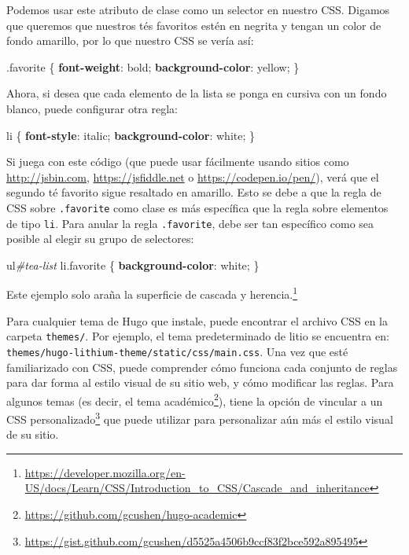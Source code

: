 \documentclass[12pt,]{krantz}
\makeatletter
\newenvironment{Shaded}{\begin{snugshade}}{\end{snugshade}}
\newcommand{\DecValTok}[1]{\textcolor[rgb]{0.00,0.00,0.81}{#1}}
\newcommand{\FunctionTok}[1]{\textcolor[rgb]{0.00,0.00,0.00}{#1}}
\newcommand{\KeywordTok}[1]{\textcolor[rgb]{0.13,0.29,0.53}{\textbf{#1}}}
\newcommand{\NormalTok}[1]{#1}
\newcommand{\PreprocessorTok}[1]{\textcolor[rgb]{0.56,0.35,0.01}{\textit{#1}}}
\renewcommand{\href}[2]{#2\footnote{\url{#1}}}
\newenvironment{kframe}{%
\medskip{}
\setlength{\fboxsep}{.8em}
 \def\at@end@of@kframe{}%
 \ifinner\ifhmode%
  \def\at@end@of@kframe{\end{minipage}}%
  \begin{minipage}{\columnwidth}%
 \fi\fi%
 \def\FrameCommand##1{\hskip\@totalleftmargin \hskip-\fboxsep
 \colorbox{shadecolor}{##1}\hskip-\fboxsep
     \hskip-\linewidth \hskip-\@totalleftmargin \hskip\columnwidth}%
 \MakeFramed {\advance\hsize-\width
   \@totalleftmargin\z@ \linewidth\hsize
   \@setminipage}}%
 {\par\unskip\endMakeFramed%
 \at@end@of@kframe}
\renewenvironment{Shaded}{\begin{kframe}}{\end{kframe}}
\theoremstyle{definition}
\theoremstyle{definition}
\theoremstyle{definition}
\theoremstyle{remark}
\makeatother
\begin{document}
Podemos usar este atributo de clase como un selector en nuestro CSS.
Digamos que queremos que nuestros tés favoritos estén en negrita y
tengan un color de fondo amarillo, por lo que nuestro CSS se vería así:

\begin{Shaded}
\begin{Highlighting}[]
\FunctionTok{.favorite}\NormalTok{ \{}
  \KeywordTok{font-weight}\NormalTok{: }\DecValTok{bold}\NormalTok{;}
  \KeywordTok{background-color}\NormalTok{: }\DecValTok{yellow}\NormalTok{;}
\NormalTok{\}}
\end{Highlighting}
\end{Shaded}

Ahora, si desea que cada elemento de la lista se ponga en cursiva con un
fondo blanco, puede configurar otra regla:

\begin{Shaded}
\begin{Highlighting}[]
\NormalTok{li \{ }
  \KeywordTok{font-style}\NormalTok{: }\DecValTok{italic}\NormalTok{;}
  \KeywordTok{background-color}\NormalTok{: }\DecValTok{white}\NormalTok{;}
\NormalTok{\}}
\end{Highlighting}
\end{Shaded}

Si juega con este código (que puede usar fácilmente usando sitios como
\url{http://jsbin.com}, \url{https://jsfiddle.net} o
\url{https://codepen.io/pen/}), verá que el segundo té favorito sigue
resaltado en amarillo. Esto se debe a que la regla de CSS sobre
\texttt{.favorite} como clase es más específica que la regla sobre
elementos de tipo \texttt{li}. Para anular la regla \texttt{.favorite},
debe ser tan específico como sea posible al elegir su grupo de
selectores:

\begin{Shaded}
\begin{Highlighting}[]
\NormalTok{ul}\PreprocessorTok{#tea-list}\NormalTok{ li}\FunctionTok{.favorite}\NormalTok{ \{}
  \KeywordTok{background-color}\NormalTok{: }\DecValTok{white}\NormalTok{;}
\NormalTok{\}}
\end{Highlighting}
\end{Shaded}

Este ejemplo solo araña la superficie de
\href{https://developer.mozilla.org/en-US/docs/Learn/CSS/Introduction_to_CSS/Cascade_and_inheritance}{cascada
y herencia.}

Para cualquier tema de Hugo que instale, puede encontrar el archivo CSS
en la carpeta \texttt{themes/}. Por ejemplo, el tema predeterminado de
litio se encuentra en:
\texttt{themes/hugo-lithium-theme/static/css/main.css}. Una vez que esté
familiarizado con CSS, puede comprender cómo funciona cada conjunto de
reglas para dar forma al estilo visual de su sitio web, y cómo modificar
las reglas. Para algunos temas (es decir, el
\href{https://github.com/gcushen/hugo-academic}{tema académico}), tiene
la opción de vincular a un
\href{https://gist.github.com/gcushen/d5525a4506b9ccf83f2bce592a895495}{CSS
personalizado} que puede utilizar para personalizar aún más el estilo
visual de su sitio.
\end{document}
